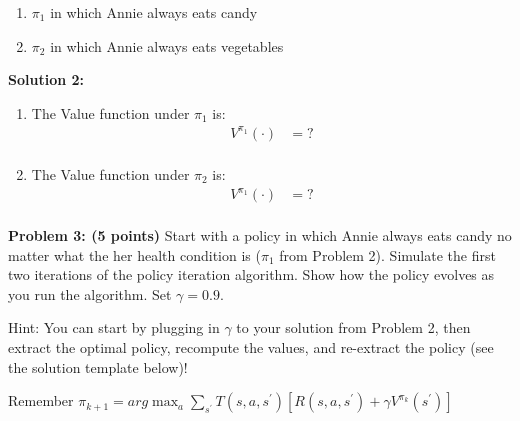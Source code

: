 \documentclass[]{article}
\begin{document}
\begin{enumerate}[label=(\alph*)]
    \item $\pi_1$ in which Annie always eats candy
    \item $\pi_2$ in which Annie always eats vegetables
\end{enumerate}

\bigskip

\textbf{Solution 2:}
\begin{enumerate}[label=(\alph*)]
    \item The Value function under $\pi_1$ is:\\
    \begin{equation*}
    \begin{split}
        V^{\pi_1}(\cdot) &= ? \\
    \end{split}
    \end{equation*}
    
    \item The Value function under $\pi_2$ is:\\
    \begin{equation*}
    \begin{split}
        V^{\pi_1}(\cdot) &= ? \\
    \end{split}
    \end{equation*}
\end{enumerate}

\clearpage
\textbf{Problem 3: (5 points)}
Start with a policy in which Annie always eats candy no matter what the her health condition is ($\pi_1$ from Problem 2). Simulate the first two iterations of the policy iteration algorithm. Show how the policy evolves as you run the algorithm. Set $\gamma = 0.9$. 

Hint: You can start by plugging in $\gamma$ to your solution from Problem 2, then extract the optimal policy, recompute the values, and re-extract the policy (see the solution template below)!

Remember $\pi_{k+1} = arg\max_a \sum_{s^\prime} T(s,a,s^{\prime})\left[R(s,a,s^\prime) + \gamma V^{\pi_k}(s^\prime)\right]$\\

\bigskip
\end{document}

